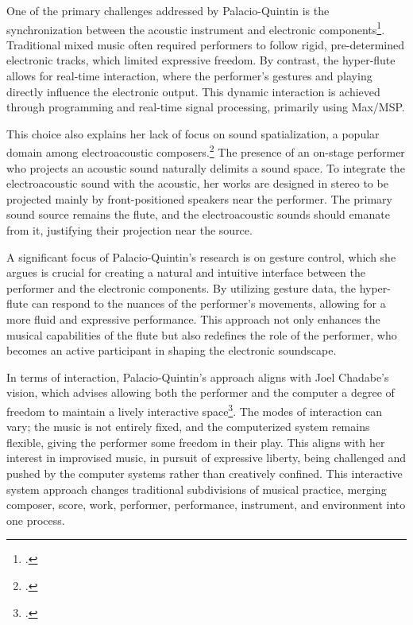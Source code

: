 \documentclass[12pt,twoside,maitrise]{dms_ks}
\theoremstyle{definition}
\begin{document}
One of the primary challenges addressed by Palacio-Quintin is the synchronization between the acoustic instrument and electronic components\footcite{palacio-quintin_composition_2012-1}. 
Traditional mixed music often required performers to follow rigid, pre-determined electronic tracks, which limited expressive freedom. 
By contrast, the hyper-flute allows for real-time interaction, where the performer's gestures and playing directly influence the electronic output. 
This dynamic interaction is achieved through programming and real-time signal processing, primarily using Max/MSP.

This choice also explains her lack of focus on sound spatialization, a popular domain among electroacoustic composers.\footcite[50]{palacio-quintin_composition_2012-1} 
The presence of an on-stage performer who projects an acoustic sound naturally delimits a sound space. 
To integrate the electroacoustic sound with the acoustic, her works are designed in stereo to be projected mainly by front-positioned speakers near the performer. 
The primary sound source remains the flute, and the electroacoustic sounds should emanate from it, justifying their projection near the source.

A significant focus of Palacio-Quintin's research is on gesture control, which she argues is crucial for creating a natural and intuitive interface between the performer and the electronic components. 
By utilizing gesture data, the hyper-flute can respond to the nuances of the performer's movements, allowing for a more fluid and expressive performance. 
This approach not only enhances the musical capabilities of the flute but also redefines the role of the performer, who becomes an active participant in shaping the electronic soundscape.

In terms of interaction, Palacio-Quintin’s approach aligns with Joel Chadabe's vision, which advises allowing both the performer and the computer a degree of freedom to maintain a lively interactive space\footcite[23]{chadabe_interactive_1984}. 
The modes of interaction can vary; the music is not entirely fixed, and the computerized system remains flexible, giving the performer some freedom in their play. 
This aligns with her interest in improvised music, in pursuit of expressive liberty, being challenged and pushed by the computer systems rather than creatively confined. 
This interactive system approach changes traditional subdivisions of musical practice, merging composer, score, work, performer, performance, instrument, and environment into one process.
\end{document}
